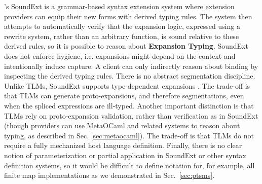 \documentclass[acmsmall]{acmart}
\begin{document}
\citet{conf/icfp/LorenzenE13,conf/popl/LorenzenE16}'s SoundExt is a grammar-based syntax extension system where extension providers can equip their new forms with derived typing rules. The system then attempts to automatically verify that the expansion logic, expressed using a rewrite system, rather than an arbitrary function, is sound relative to these derived rules, so it is possible to reason about \textbf{Expansion Typing}. SoundExt does not enforce hygiene, i.e. expansions might depend on the context and intentionally induce capture. A client can only indirectly reason about binding by inspecting the derived typing rules. There is no abstract segmentation discipline. Unlike TLMs, SoundExt supports type-dependent expansions \cite{conf/popl/LorenzenE16}. The trade-off is that TLMs can generate proto-expansions, and therefore segmentations, even when the spliced expressions are ill-typed. Another important distinction is that TLMs rely on proto-expansion validation, rather than verification as in SoundExt (though providers can use MetaOCaml and related systems to reason about typing, as described in Sec. \ref{sec:metaocaml}). The trade-off is that TLMs do not require a fully mechanized host language definition. Finally, there is no clear notion of parameterization or partial application in SoundExt or other syntax definition systems, so it would be difficult to define notation for, for example, all finite map implementations as we demonstrated in Sec.~\ref{sec:ptsms}.



\end{document}

